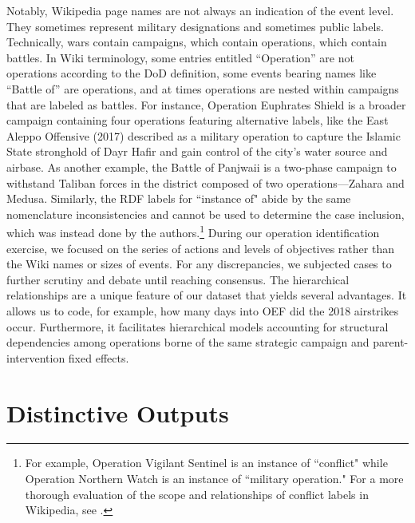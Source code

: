 \documentclass[fleqn,12pt]{article}
\begin{document}
Notably, Wikipedia page names are not always an indication of the event level. They sometimes represent military designations and sometimes public labels. Technically, wars contain campaigns, which contain operations, which contain battles. In Wiki terminology, some entries entitled ``Operation” are not operations according to the DoD definition, some events bearing names like ``Battle of” are operations, and at times operations are nested within campaigns that are labeled as battles. For instance, Operation Euphrates Shield is a broader campaign containing four operations featuring alternative labels, like the East Aleppo Offensive (2017) described as a military operation to capture the Islamic State stronghold of Dayr Hafir and gain control of the city’s water source and airbase. As another example, the Battle of Panjwaii is a two-phase campaign to withstand Taliban forces in the district composed of two operations—Zahara and Medusa. Similarly, the RDF labels for ``instance of" abide by the same nomenclature inconsistencies and cannot be used to determine the case inclusion, which was instead done by the authors.\footnote{For example, Operation Vigilant Sentinel is an instance of ``conflict" while Operation Northern Watch is an instance of ``military operation." For a more thorough evaluation of the scope and relationships of conflict labels in Wikipedia, see \citet{douglass_connectingconflictdata_2022}.} During our operation identification exercise, we focused on the series of actions and levels of objectives rather than the Wiki names or sizes of events. For any discrepancies, we subjected cases to further scrutiny and debate until reaching consensus. The hierarchical relationships are a unique feature of our dataset that yields several advantages. It allows us to code, for example, how many days into OEF did the 2018 airstrikes occur. Furthermore, it facilitates hierarchical models accounting for structural dependencies among operations borne of the same strategic campaign and parent-intervention fixed effects.

\section*{Distinctive Outputs}
\end{document}
